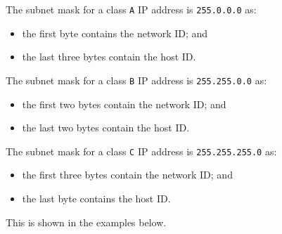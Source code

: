 \documentclass[a4paper]{systems-software}
\begin{document}
The subnet mask for a class \texttt{A} IP address is \texttt{255.0.0.0} as:
\begin{itemize}
	\item the first byte contains the network ID; and
	\item the last three bytes contain the host ID.
\end{itemize}

The subnet mask for a class \texttt{B} IP address is \texttt{255.255.0.0} as:
\begin{itemize}
	\item the first two bytes contain the network ID; and
	\item the last two bytes contain the host ID.
\end{itemize}

The subnet mask for a class \texttt{C} IP address is \texttt{255.255.255.0} as:
\begin{itemize}
	\item the first three bytes contain the network ID; and
	\item the last byte contains the host ID.
\end{itemize}

This is shown in the examples below.
\end{document}
